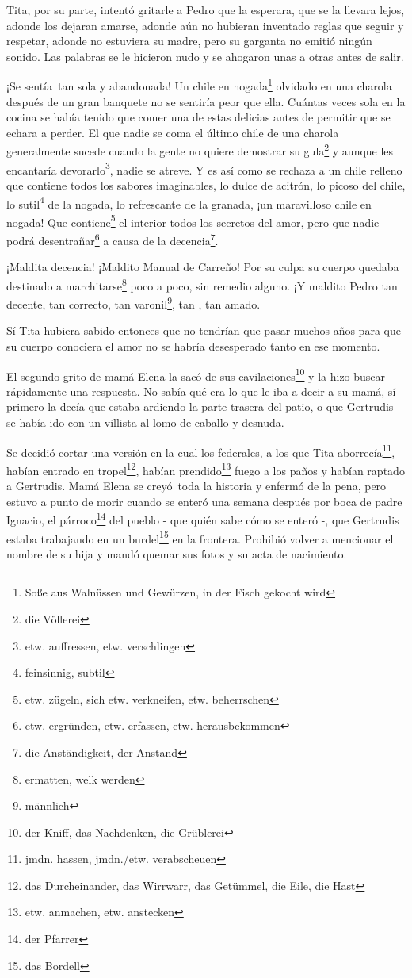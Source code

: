 Tita, por su parte, intentó gritarle a Pedro que la esperara, que se la
llevara lejos, adonde los dejaran amarse, adonde aún no hubieran
inventado reglas que seguir y respetar, adonde no estuviera su madre,
pero su garganta no emitió ningún sonido. Las palabras se le hicieron
nudo y se ahogaron unas a otras antes de salir.

¡Se sentía~tan sola y abandonada! Un chile en nogada\footnote{Soße aus Walnüssen und Gewürzen, in der Fisch gekocht wird}
olvidado en una charola después de un gran banquete no se sentiría peor
que ella.
Cuántas veces sola en la cocina se había tenido que comer una de estas
delicias antes de permitir que se echara a perder. El que nadie se coma
el último chile de una charola generalmente sucede cuando la gente no
quiere demostrar su gula\footnote{die Völlerei} y aunque les
encantaría devorarlo\footnote{etw. auffressen, etw. verschlingen},
nadie se atreve. Y es así como se rechaza a un chile relleno que contiene
todos los sabores imaginables, lo dulce de acitrón, lo picoso del chile, lo sutil\footnote{feinsinnig, subtil} de la nogada, lo refrescante de la granada,
¡un maravilloso chile en nogada! Que contiene\footnote{etw. zügeln, sich etw. verkneifen, etw. beherrschen}
el interior todos los secretos del amor, pero que nadie podrá desentrañar\footnote{etw. ergründen, etw. erfassen, etw. herausbekommen}
a causa de la decencia\footnote{die Anständigkeit, der Anstand}.

¡Maldita decencia! ¡Maldito Manual de Carreño! Por su culpa su cuerpo
quedaba destinado a marchitarse\footnote{ermatten, welk werden}
poco a poco, sin remedio alguno. ¡Y maldito Pedro tan decente, tan correcto,
tan varonil\footnote{männlich}, tan \ndots, tan amado.

Sí Tita hubiera sabido entonces que no tendrían que pasar muchos años
para que su cuerpo conociera el amor no se habría desesperado tanto en
ese momento.

El segundo grito de mamá Elena la sacó de sus cavilaciones\footnote{der Kniff, das Nachdenken, die Grüblerei}
y la hizo buscar rápidamente una respuesta. No sabía qué era lo que le iba
a decir a su mamá, sí primero la decía que estaba ardiendo la parte trasera
del patio, o que Gertrudis se había ido con un villista al lomo de caballo
\ndots y desnuda.

Se decidió cortar una versión en la cual los federales, a los que Tita aborrecía\footnote{jmdn. hassen, jmdn./etw. verabscheuen},
habían entrado en tropel\footnote{das Durcheinander, das Wirrwarr, das Getümmel, die Eile, die Hast},
habían prendido\footnote{etw. anmachen, etw. anstecken} fuego a
los paños y habían raptado a Gertrudis. Mamá Elena se creyó~toda la historia y
enfermó de la pena, pero estuvo a punto de morir cuando se enteró una
semana después por boca de padre Ignacio, el párroco\footnote{der Pfarrer}
del pueblo - que quién sabe cómo se enteró -, que Gertrudis estaba trabajando en un burdel\footnote{das Bordell} en la frontera. Prohibió volver a mencionar
el nombre de su hija y mandó quemar sus fotos y su acta de nacimiento.

